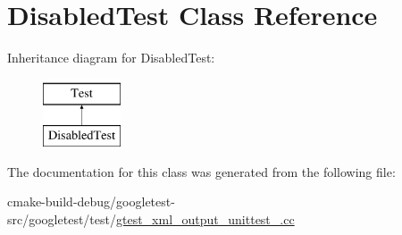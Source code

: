 \hypertarget{classDisabledTest}{}\section{Disabled\+Test Class Reference}
\label{classDisabledTest}
Inheritance diagram for Disabled\+Test\+:\begin{figure}[H]
\begin{center}
\leavevmode
\includegraphics[height=2.000000cm]{classDisabledTest}
\end{center}
\end{figure}


The documentation for this class was generated from the following file\+:\begin{DoxyCompactItemize}
\item 
cmake-\/build-\/debug/googletest-\/src/googletest/test/\mbox{\hyperlink{gtest__xml__output__unittest___8cc}{gtest\+\_\+xml\+\_\+output\+\_\+unittest\+\_\+.\+cc}}\end{DoxyCompactItemize}
